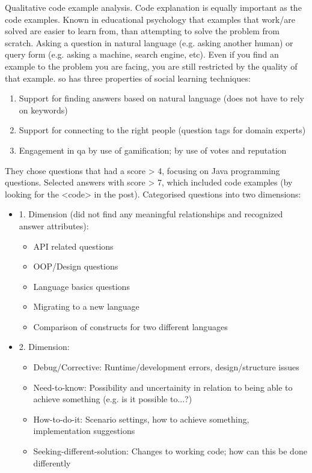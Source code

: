 Qualitative code example analysis. 
Code explanation is equally important as the code examples. 
Known in educational psychology that examples that work/are solved are easier to learn from, than attempting to solve the problem from scratch. 
Asking a question in natural language (e.g. asking another human) or query form (e.g. asking a machine, search engine, etc). 
Even if you find an example to the problem you are facing, you are still restricted by the quality of that example. 
\gls{so} has three properties of social learning techniques:
\begin{enumerate}
	\item Support for finding answers based on natural language (does not have to rely on keywords)
	\item Support for connecting to the right people (question tags for domain experts)
	\item Engagement in qa by use of gamification; by use of votes and reputation
\end{enumerate}
They chose questions that had a score > 4, focusing on Java programming questions. Selected answers with score > 7, which included code examples (by looking for the <code> in the post).
Categorised questions into two dimensions: 
\begin{itemize}
	\item 1. Dimension (did not find any meaningful relationships and recognized answer attributes):
	\begin{itemize}
		\item API related questions
		\item OOP/Design questions
		\item Language basics questions
		\item Migrating to a new language
		\item Comparison of constructs for two different languages
	\end{itemize}
	\item 2. Dimension:
	\begin{itemize}
		\item Debug/Corrective: Runtime/development errors, design/structure issues
		\item Need-to-know: Possibility and uncertainity in relation to being able to achieve something (e.g. is it possible to...?)
		\item How-to-do-it: Scenario settings, how to achieve something, implementation suggestions
		\item Seeking-different-solution: Changes to working code; how can this be done differently
	\end{itemize}
\end{itemize}
